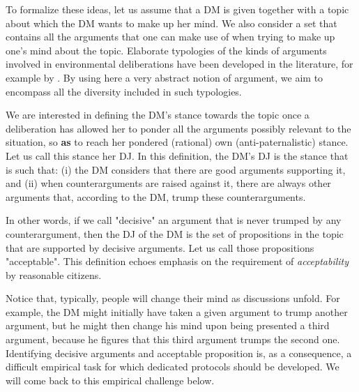 \documentclass[a4paper, 11pt]{article}
\begin{document}
To formalize these ideas, let us assume that a \ac{DM} is given together with a topic about which the \ac{DM} wants to make up her mind.
We also consider a set that contains all the arguments that one can make use of when trying to make up one’s mind about the topic.
Elaborate typologies of the kinds of arguments involved in environmental deliberations have been developed in the literature, for example by \citet{chateauraynaud_contrainte_2007}. 
By using here a very abstract notion of argument, we aim to encompass all the diversity included in such typologies. 

We are interested in defining the \ac{DM}’s stance towards the topic once a deliberation has allowed her to ponder all the arguments possibly relevant to the situation, so \textbf{as} to reach her pondered (rational) own (anti-paternalistic) stance. Let us call this stance her \ac{DJ}. In this definition, the \ac{DM}’s \ac{DJ} is the stance that is such that: (i) the \ac{DM} considers that there are good arguments supporting it, and (ii) when counterarguments are raised against it, there are always other arguments that, according to the \ac{DM}, trump these counterarguments.

In other words, if we call "decisive" an argument that is never trumped by any counterargument, then the \ac{DJ} of the \ac{DM} is the set of propositions in the topic that are supported by decisive arguments. Let us call those propositions "acceptable". This definition echoes  emphasis on the requirement of \emph{acceptability} by reasonable citizens. 


Notice that, typically, people will change their mind as discussions unfold. For example, the \ac{DM} might initially have taken a given argument to trump another argument, but he might then change his mind upon being presented a third argument, because he figures that this third argument trumps the second one. Identifying decisive arguments and acceptable proposition is, as a consequence, a difficult empirical task for which dedicated protocols should be developed. We will come back to this empirical challenge below.
\end{document}

